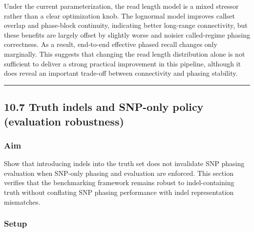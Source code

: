 \documentclass[
]{article}
\begin{document}
Under the current parameterization, the read length model is a mixed
stressor rather than a clear optimization knob. The lognormal model
improves callset overlap and phase-block continuity, indicating better
long-range connectivity, but these benefits are largely offset by
slightly worse and noisier called-regime phasing correctness. As a
result, end-to-end effective phased recall changes only marginally. This
suggests that changing the read length distribution alone is not
sufficient to deliver a strong practical improvement in this pipeline,
although it does reveal an important trade-off between connectivity and
phasing stability.

\begin{center}\rule{0.5\linewidth}{0.5pt}\end{center}

\subsection{10.7 Truth indels and SNP-only policy (evaluation
robustness)}\label{truth-indels-and-snp-only-policy-evaluation-robustness}

\subsubsection{Aim}\label{aim-5}

Show that introducing indels into the truth set does not invalidate SNP
phasing evaluation when SNP-only phasing and evaluation are enforced.
This section verifies that the benchmarking framework remains robust to
indel-containing truth without conflating SNP phasing performance with
indel representation mismatches.

\subsubsection{Setup}\label{setup-5}
\end{document}
